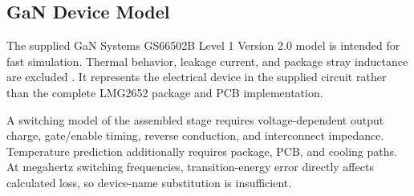 \subsection{GaN Device Model}
\label{sec:sim-ganmodel}

The supplied GaN Systems GS66502B Level 1 Version 2.0 model is intended for fast simulation. Thermal behavior, leakage current, and package stray inductance are excluded \cite{gansystemsGS66502Bmodel}. It represents the electrical device in the supplied circuit rather than the complete LMG2652 package and PCB implementation.

A switching model of the assembled stage requires voltage-dependent output charge, gate/enable timing, reverse conduction, and interconnect impedance. Temperature prediction additionally requires package, PCB, and cooling paths. At megahertz switching frequencies, transition-energy error directly affects calculated loss, so device-name substitution is insufficient.
